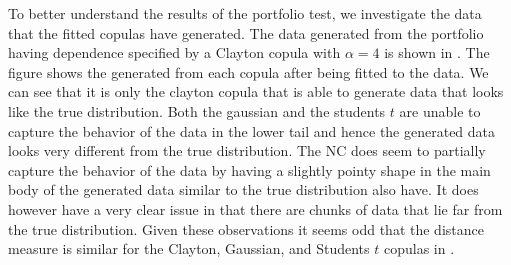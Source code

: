 To better understand the results of the portfolio test, we investigate the data that the fitted copulas have generated. The data generated from the portfolio having dependence specified by a Clayton copula with $\alpha=4$ is shown in . The figure shows the generated from each copula after being fitted to the data. We can see that it is only the clayton copula that is able to generate data that looks like the true distribution. Both the gaussian and the students $t$ are unable to capture the behavior of the data in the lower tail and hence the generated data looks very different from the true distribution. The \gls{NC} does seem to partially capture the behavior of the data by having a slightly pointy shape in the main body of the generated data similar to the true distribution also have. It does however have a very clear issue in that there are chunks of data that lie far from the true distribution. Given these observations it seems odd that the distance measure is similar for the Clayton, Gaussian, and Students $t$ copulas in . 

